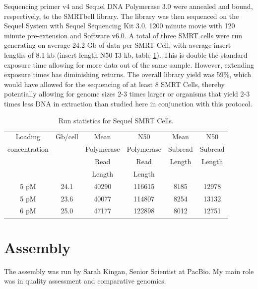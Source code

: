 \par{
Sequencing primer v4 and Sequel DNA Polymerase 3.0 were annealed and bound, respectively, to the SMRTbell library. The library was then sequenced on the Sequel System with Sequel Sequencing Kit 3.0. 1200 minute movie with 120 minute pre-extension and Software v6.0. A total of three SMRT cells were run generating on average 24.2 Gb of data per SMRT Cell, with average insert lengths of 8.1 kb (insert length N50 \~13 kb, table \ref{table:dataamount}). This is double the standard exposure time allowing for more data out of the same sample. However, extending exposure times has diminishing returns. The overall library yield was 59\%, which would have allowed for the sequencing of at least 8 SMRT Cells, thereby potentially allowing for genome sizes 2-3 times larger or organisms that yield 2-3 times less DNA in extraction than studied here in conjunction with this protocol.
}

\begin{table}[htbp!]
\caption{Run statistics for Sequel SMRT Cells.}\label{table:dataamount}
\begin{tabular}{| c | c | c | c | c | c |}
\hline
Loading & Gb/cell & Mean  & N50 &  Mean &  N50  \\
concentration & & Polymerase & Polymerase & Subread & Subread \\
& & Read & Read & Length & Length \\ 
& & Length &Length & & \\\hline
5 pM & 24.1 & 40290 & 116615 & 8185 & 12978 \\\hline
5 pM & 23.6 & 40077 & 114807 & 8254 & 13132 \\\hline
6 pM & 25.0 & 47177 & 122898 & 8012 & 12751 \\\hline
\end{tabular}
\end{table}



\section{Assembly}

The assembly was run by Sarah Kingan, Senior Scientist at PacBio. My main role was in quality assessment and comparative genomics. \\

